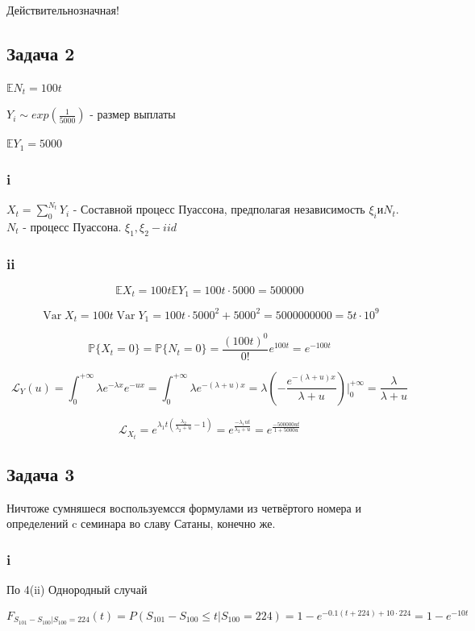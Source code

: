 \documentclass[a4paper,12pt]{article}
\renewcommand{\L}{\mathrm{L}}
\def \mbb{\mathbb}
\DeclareMathOperator{\Var}{Var}
\def \P{\mbb{P}}
\def \E{\mbb{E}}
\def \L{\mathcal{L}}
\begin{document}
Действительнозначная!


\subsection{Задача 2}

$ \E N_t = 100t $

$ Y_i \sim exp(\frac{1}{5000}) $ - размер выплаты

$ \E Y_1  = 5000$

\subsubsection{i}

$ X_t = \sum_{0}^{N_t} Y_i $ - Составной процесс Пуассона, предполагая независимость $ \xi_i и N_t $. $ N_t $ - процесс Пуассона. $ \xi_1, \xi_2 - iid $

\subsubsection{ii}

\[ \E X_t = 100t \E Y_1 = 100t \cdot 5000 = 500000 \]

\[ \Var X_t = 100t \Var Y_1 = 100t \cdot 5000^2 + 5000^2 =5000000000 = 5t\cdot10^9  \]

\[ \P\{ X_t = 0 \} = \P\{ N_t = 0 \} = \frac{(100t)^0}{0!}e^{100t} = e^{-100t} \]

\[ \L_Y(u) = \int_{0}^{+\infty} \lambda e^{-\lambda x} e^{-ux}  = \int_{0}^{+\infty} \lambda e^{-(\lambda + u)x} = \lambda (- \frac{e^{-(\lambda + u)x}}{\lambda + u})\biggr|_0^{+\infty} = \frac{\lambda}{\lambda + u} \]

\[ \L_{X_t}  = e^{\lambda_1 t (\frac{\lambda_2}{\lambda_2 + u} - 1)} = e^{\frac{-\lambda_1 u t}{\lambda_2 + u}}  = e^\frac{-500000 u t}{1 + 5000u}\]

\subsection{Задача 3}
Ничтоже сумняшеся воспользуемсся формулами из четвёртого номера  и определений c семинара во славу Сатаны, конечно же. 

\subsubsection{i}

По 4(ii)
Однородный случай

$$ F_{S_{101} - S_{100}|S_{100} = 224}(t) = P(S_{101} - S_{100} \le t|S_{100} = 224) = 1 - e^{-0.1(t+224) + 10 \cdot 224} = 1 - e^{-10 t}$$
\end{document}
